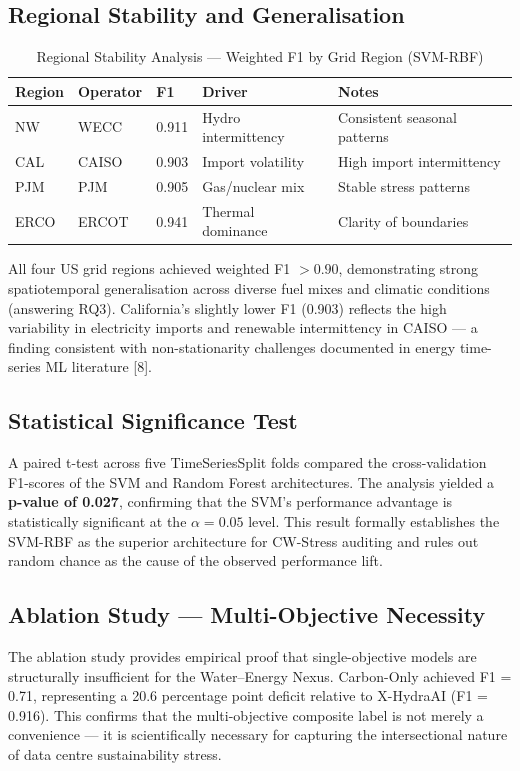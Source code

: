\documentclass[conference]{IEEEtran}
\begin{document}
\subsection{Regional Stability and Generalisation}

\begin{table}[htbp]
\caption{Regional Stability Analysis — Weighted F1 by Grid Region (SVM-RBF)}
\begin{center}
\begin{tabular}{|l|l|l|l|l|}
\hline
\textbf{Region} & \textbf{Operator} & \textbf{F1} & \textbf{Driver} & \textbf{Notes} \\ \hline
NW & WECC & 0.911 & Hydro intermittency & Consistent seasonal patterns \\ \hline
CAL & CAISO & 0.903 & Import volatility & High import intermittency \\ \hline
PJM & PJM & 0.905 & Gas/nuclear mix & Stable stress patterns \\ \hline
ERCO & ERCOT & 0.941 & Thermal dominance & Clarity of boundaries \\ \hline
\end{tabular}
\end{center}
\end{table}

All four US grid regions achieved weighted F1 $> 0.90$, demonstrating strong spatiotemporal generalisation across diverse fuel mixes and climatic conditions (answering RQ3). California's slightly lower F1 (0.903) reflects the high variability in electricity imports and renewable intermittency in CAISO — a finding consistent with non-stationarity challenges documented in energy time-series ML literature [8].

\subsection{Statistical Significance Test}
A paired t-test across five TimeSeriesSplit folds compared the cross-validation F1-scores of the SVM and Random Forest architectures. The analysis yielded a \textbf{p-value of 0.027}, confirming that the SVM's performance advantage is statistically significant at the $\alpha = 0.05$ level. This result formally establishes the SVM-RBF as the superior architecture for CW-Stress auditing and rules out random chance as the cause of the observed performance lift.

\subsection{Ablation Study — Multi-Objective Necessity}
The ablation study provides empirical proof that single-objective models are structurally insufficient for the Water–Energy Nexus. Carbon-Only achieved F1 = 0.71, representing a 20.6 percentage point deficit relative to X-HydraAI (F1 = 0.916). This confirms that the multi-objective composite label is not merely a convenience — it is scientifically necessary for capturing the intersectional nature of data centre sustainability stress.
\end{document}
